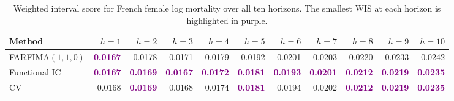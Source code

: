 \begin{table}[!htb]
\centering
\begingroup\fontsize{7}{9}\selectfont
\setlength{\tabcolsep}{2.5pt}
\caption{Weighted interval score for French female log mortality over all ten horizons. The smallest WIS at each horizon is highlighted in purple.}
\label{tab:emp-female-mortality-wis}
\begin{tabular}{lrrrrrrrrrr}
\toprule
Method & $h=1$ & $h=2$ & $h=3$ & $h=4$ & $h=5$ & $h=6$ & $h=7$ & $h=8$ & $h=9$ & $h=10$ \\
\midrule
FARFIMA$(1,1,0)$ & \textcolor{purple}{\textbf{0.0167}} & 0.0178 & 0.0171 & 0.0179 & 0.0192 & 0.0201 & 0.0203 & 0.0220 & 0.0233 & 0.0242 \\
Functional IC & \textcolor{purple}{\textbf{0.0167}} & \textcolor{purple}{\textbf{0.0169}} & \textcolor{purple}{\textbf{0.0167}} & \textcolor{purple}{\textbf{0.0172}} & \textcolor{purple}{\textbf{0.0181}} & \textcolor{purple}{\textbf{0.0193}} & \textcolor{purple}{\textbf{0.0201}} & \textcolor{purple}{\textbf{0.0212}} & \textcolor{purple}{\textbf{0.0219}} & \textcolor{purple}{\textbf{0.0235}} \\
CV & 0.0168 & \textcolor{purple}{\textbf{0.0169}} & 0.0168 & 0.0174 & \textcolor{purple}{\textbf{0.0181}} & 0.0194 & 0.0202 & \textcolor{purple}{\textbf{0.0212}} & \textcolor{purple}{\textbf{0.0219}} & \textcolor{purple}{\textbf{0.0235}} \\
\bottomrule
\end{tabular}
\endgroup
\end{table}

